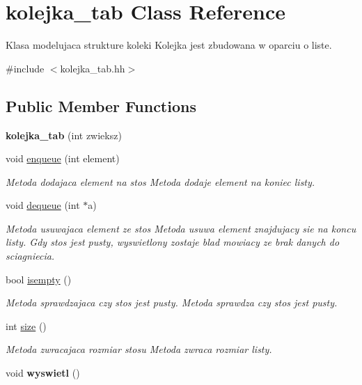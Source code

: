 \hypertarget{classkolejka__tab}{\section{kolejka\-\_\-tab Class Reference}
\label{classkolejka__tab}
}


Klasa modelujaca strukture koleki Kolejka jest zbudowana w oparciu o liste.  




{\ttfamily \#include $<$kolejka\-\_\-tab.\-hh$>$}

\subsection*{Public Member Functions}
\begin{DoxyCompactItemize}
\item 
\hypertarget{classkolejka__tab_a4e1582f2650e0251ae7b286cc2252898}{{\bfseries kolejka\-\_\-tab} (int zwieksz)}\label{classkolejka__tab_a4e1582f2650e0251ae7b286cc2252898}

\item 
void \hyperlink{classkolejka__tab_a722997bbf6525eb8494999e79a3eb6a9}{enqueue} (int element)
\begin{DoxyCompactList}\small\item\em Metoda dodajaca element na stos Metoda dodaje element na koniec listy. \end{DoxyCompactList}\item 
void \hyperlink{classkolejka__tab_a1efa76f06261d81e24dc15f52a1dcace}{dequeue} (int $\ast$a)
\begin{DoxyCompactList}\small\item\em Metoda usuwajaca element ze stos Metoda usuwa element znajdujacy sie na koncu listy. Gdy stos jest pusty, wyswietlony zostaje blad mowiacy ze brak danych do sciagniecia. \end{DoxyCompactList}\item 
bool \hyperlink{classkolejka__tab_aeb23e2580566a1978e846453deea1bec}{isempty} ()
\begin{DoxyCompactList}\small\item\em Metoda sprawdzajaca czy stos jest pusty. Metoda sprawdza czy stos jest pusty. \end{DoxyCompactList}\item 
int \hyperlink{classkolejka__tab_a0cce5421e6f7e1fb2040a2be78ec15af}{size} ()
\begin{DoxyCompactList}\small\item\em Metoda zwracajaca rozmiar stosu Metoda zwraca rozmiar listy. \end{DoxyCompactList}\item 
\hypertarget{classkolejka__tab_afd57651509f2f355d5037bc9e8f58375}{void {\bfseries wyswietl} ()}\label{classkolejka__tab_afd57651509f2f355d5037bc9e8f58375}

\end{DoxyCompactItemize}



